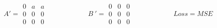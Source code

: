 \documentclass{article}
\begin{document}
\[ A' = \begin{matrix} 0 & a & a \\ 0 & 0 & 0 \\ 0 & 0 & 0 \end{matrix} \qquad\qquad\qquad B\ ' = \begin{matrix} 0 & 0 & 0 \\ 0 & 0 & 0 \\ 0 & 0 & 0 \end{matrix} \qquad\qquad\qquad Loss = MSE \]
\pagebreak
\end{document}

